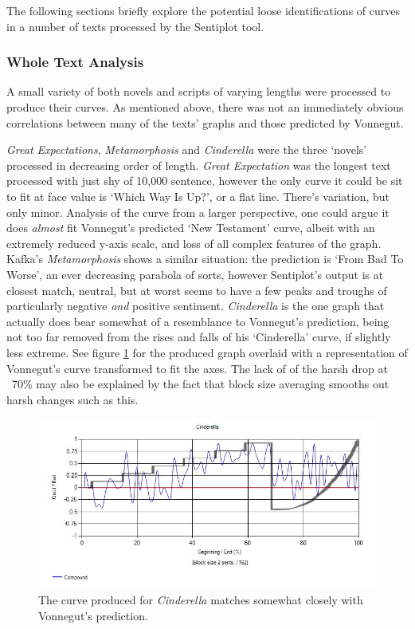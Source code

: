 \documentclass{article}
\begin{document}
        The following sections briefly explore the potential loose identifications of curves in a number of texts processed by the Sentiplot tool.
        \subsubsection{Whole Text Analysis}
            A small variety of both novels and scripts of varying lengths were processed to produce their curves. As mentioned above, there was not an immediately obvious correlations between many of the texts' graphs and those predicted by Vonnegut. 
            
            \textit{Great Expectations}, \textit{Metamorphosis} and \textit{Cinderella} were the three `novels' processed in decreasing order of length. \textit{Great Expectation} was the longest text processed with just shy of 10,000 sentence, however the only curve it could be sit to fit at face value is `Which Way Is Up?', or a flat line. There's variation, but only minor. Analysis of the curve from a larger perspective, one could argue it does \textit{almost} fit Vonnegut's predicted `New Testament' curve, albeit with an extremely reduced y-axis scale, and loss of all complex features of the graph. Kafka's \textit{Metamorphosis} shows a similar situation: the prediction is `From Bad To Worse', an ever decreasing parabola of sorts, however Sentiplot's output is at closest match, neutral, but at worst seems to have a few peaks and troughs of particularly negative \textit{and} positive sentiment. \textit{Cinderella} is the one graph that actually does bear somewhat of a resemblance to Vonnegut's prediction, being not too far removed from the rises and falls of his `Cinderella' curve, if slightly less extreme. See figure \ref{fig:cinderellaComp} for the produced graph overlaid with a representation of Vonnegut's curve transformed to fit the axes. The lack of of the harsh drop at ~70\% may also be explained by the fact that block size averaging smooths out harsh changes such as this.
            \begin{figure}[hb]
                \includegraphics[width=1\textwidth]{Figures/Curve/CinderellaComp}
                \centering
                \caption{The curve produced for \textit{Cinderella} matches somewhat closely with Vonnegut's prediction.} 
                \label{fig:cinderellaComp}
            \end{figure}
\end{document}
